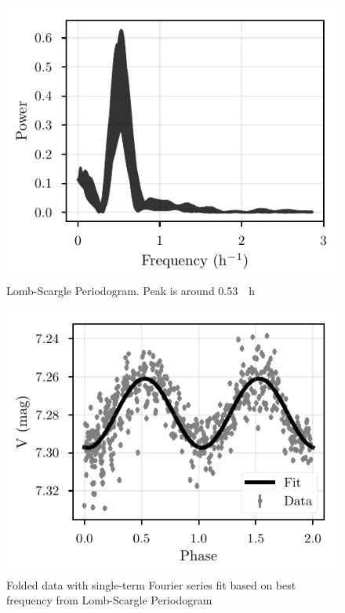 \documentclass[%
aip,
jmp,
reprint,
floatfix,
nofootinbib
]{revtex4-1}
\begin{document}
	 \begin{figure}
	 	\centering
	 	\includegraphics[width=\linewidth]{figs/power.pdf}
	 	\caption{Lomb-Scargle Periodogram. Peak is around \SI{0.53}{\per \hour}}
	 	\label{fig:power}
	 \end{figure}
 	\begin{figure}
 		\centering
 		\includegraphics[width=\linewidth]{figs/fit.pdf}
 		\caption{Folded data with single-term Fourier series fit based on best frequency from Lomb-Scargle Periodogram}
 		\label{fig:fit}
 	\end{figure}
	
\end{document}
